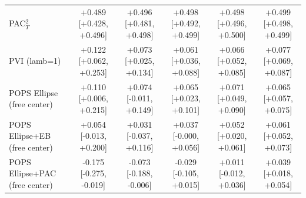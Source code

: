 \begin{tabular}{lccccc}
PAC$^2_T$ & +0.489 {\scriptsize[+0.428, +0.496]} & +0.496 {\scriptsize[+0.481, +0.498]} & +0.498 {\scriptsize[+0.492, +0.499]} & +0.498 {\scriptsize[+0.496, +0.500]} & +0.499 {\scriptsize[+0.498, +0.499]} \\
PVI (lamb=1) & +0.122 {\scriptsize[+0.062, +0.253]} & +0.073 {\scriptsize[+0.025, +0.134]} & +0.061 {\scriptsize[+0.036, +0.088]} & +0.066 {\scriptsize[+0.052, +0.085]} & +0.077 {\scriptsize[+0.069, +0.087]} \\
POPS Ellipse (free center) & +0.110 {\scriptsize[+0.006, +0.215]} & +0.074 {\scriptsize[-0.011, +0.149]} & +0.065 {\scriptsize[+0.023, +0.101]} & +0.071 {\scriptsize[+0.049, +0.090]} & +0.065 {\scriptsize[+0.057, +0.075]} \\
POPS Ellipse+EB (free center) & +0.054 {\scriptsize[-0.013, +0.200]} & +0.031 {\scriptsize[-0.037, +0.116]} & +0.037 {\scriptsize[-0.000, +0.056]} & +0.052 {\scriptsize[+0.020, +0.061]} & +0.061 {\scriptsize[+0.052, +0.073]} \\
POPS Ellipse+PAC (free center) & -0.175 {\scriptsize[-0.275, -0.019]} & -0.073 {\scriptsize[-0.188, -0.006]} & -0.029 {\scriptsize[-0.105, +0.015]} & +0.011 {\scriptsize[-0.012, +0.036]} & +0.039 {\scriptsize[+0.018, +0.054]} \\
\bottomrule
\end{tabular}

